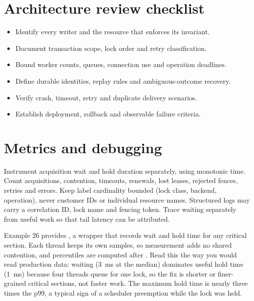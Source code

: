 
\section{Architecture review checklist}
\begin{itemize}
\item Identify every writer and the resource that enforces its invariant.
\item Document transaction scope, lock order and retry classification.
\item Bound worker counts, queues, connection use and operation deadlines.
\item Define durable identities, replay rules and ambiguous-outcome recovery.
\item Verify crash, timeout, retry and duplicate delivery scenarios.
\item Establish deployment, rollback and observable failure criteria.
\end{itemize}
\section{Metrics and debugging}
Instrument acquisition wait and hold duration separately, using monotonic time. Count acquisitions, contention, timeouts, renewals, lost leases, rejected fences, retries and errors. Keep label cardinality bounded (lock class, backend, operation), never customer IDs or individual resource names. Structured logs may carry a correlation ID, lock name and fencing token. Trace waiting separately from useful work so that tail latency can be attributed.

Example 26 provides , a wrapper that records wait and hold time for any critical section. Each thread keeps its own samples, so measurement adds no shared contention, and percentiles are computed after .
Read this the way you would read production data: waiting (3~ms at the median) dominates useful hold time (1~ms) because four threads queue for one lock, so the fix is shorter or finer-grained critical sections, not faster work. The maximum hold time is nearly three times the p99, a typical sign of a scheduler preemption while the lock was held.

